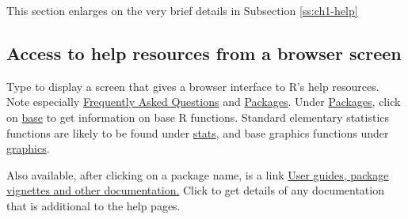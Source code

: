 \noindent
\begin{framed}
\vspace*{-10pt}
\begin{knitrout}
\color{fgcolor}\begin{kframe}
\begin{alltt}
\hlstd{()}           
       
            
    
\hlstd{()}           
\hlstd{()}       
\end{alltt}
\end{kframe}
\end{knitrout}
\vspace*{-10pt}
\end{framed}

\noindent
This section enlarges on the very brief details in Subsection \ref{ss:ch1-help}

\subsection*{Access to help resources from a browser screen}
Type  to display a screen that gives a browser
interface to R's help resources.  Note especially
\underline{Frequently Asked Questions} and \underline{Packages}.
Under \underline{Packages}, click on \underline{base} to get
information on base R functions. Standard elementary statistics
functions are likely to be found under \underline{stats}, and base
graphics functions under \underline{graphics}.

Also available, after clicking on a package name, is a link
\underline{User guides, package vignettes and other documentation.}
Click to get details of any documentation that is additional to the
help pages.

